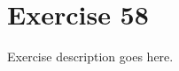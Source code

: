\section{Exercise 58}
\begin{question}
   Exercise description goes here. 
\end{question}

\begin{solution}
\end{solution}
